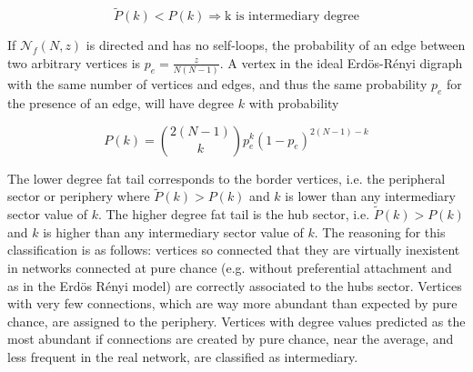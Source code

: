 \documentclass[%
	aip,
	jmp,%
	amsmath,amssymb,
	reprint,%
]{revtex4-1}
\begin{document}
\begin{equation}\label{criterio}
	\widetilde{P}(k)<P(k) \Rightarrow \text{k is intermediary degree}
\end{equation}

If $\mathcal{N}_f(N,z)$ is directed and has no self-loops, the probability
of an edge between two arbitrary vertices is $p_e=\frac{z}{N(N-1)}$.
A vertex in the ideal Erd\"os-R\'enyi digraph with the same number of vertices and edges, and thus the same probability $p_e$ for the presence of an edge, will have degree $k$ with probability

\begin{equation}
	P(k)=\binom{2(N-1)}{k}p_e^k(1-p_e)^{2(N-1)-k}
\end{equation}

The lower degree fat tail corresponds to the border vertices, i.e. the peripheral sector or periphery where $\widetilde{P}(k)>P(k)$ and $k$ is lower than any intermediary sector value of $k$. The higher degree fat tail is the hub sector, i.e. $\widetilde{P}(k)>P(k)$ and $k$ is higher than any intermediary sector value of $k$. The reasoning for this classification is as follows: vertices so connected that they are virtually inexistent in networks connected at pure chance (e.g. without preferential attachment and as in the Erd\"os R\'enyi model) are correctly associated to the hubs sector. Vertices with very few connections, which are way more abundant than expected by pure chance, are assigned to the periphery. Vertices with degree values predicted as the most abundant if connections are created by pure chance, near the average, and less frequent in the real network, are classified as intermediary.
\end{document}
